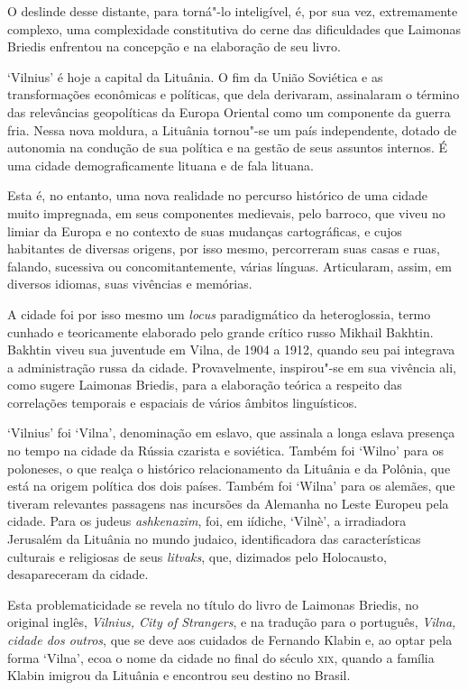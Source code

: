 O deslinde desse distante, para torná"-lo inteligível, é, por sua vez,
extremamente complexo, uma complexidade constitutiva do cerne das
dificuldades que Laimonas Briedis enfrentou na concepção e na elaboração
de seu livro.

`Vilnius' é hoje a capital da Lituânia. O fim da União Soviética e as
transformações econômicas e políticas, que dela derivaram, assinalaram o
término das relevâncias geopolíticas da Europa Oriental como um
componente da guerra fria. Nessa nova moldura, a Lituânia tornou"-se um
país independente, dotado de autonomia na condução de sua política e na
gestão de seus assuntos internos. É uma cidade demograficamente lituana
e de fala lituana.

Esta é, no entanto, uma nova realidade no percurso histórico de uma
cidade muito impregnada, em seus componentes medievais, pelo barroco,
que viveu no limiar da Europa e no contexto de suas mudanças
cartográficas, e cujos habitantes de diversas origens, por isso mesmo,
percorreram suas casas e ruas, falando, sucessiva ou concomitantemente,
várias línguas. Articularam, assim, em diversos idiomas, suas vivências
e memórias.

A cidade foi por isso mesmo um \textit{locus} paradigmático da
heteroglossia, termo cunhado e teoricamente elaborado pelo grande
crítico russo Mikhail Bakhtin. Bakhtin viveu sua juventude em Vilna, de
1904 a 1912, quando seu pai integrava a administração russa da cidade.
Provavelmente, inspirou"-se em sua vivência ali, como sugere Laimonas
Briedis, para a elaboração teórica a respeito das correlações temporais
e espaciais de vários âmbitos linguísticos.

`Vilnius' foi `Vilna', denominação em eslavo, que assinala a longa
eslava presença no tempo na cidade da Rússia czarista e soviética.
Também foi `Wilno' para os poloneses, o que realça o histórico
relacionamento da Lituânia e da Polônia, que está na origem política dos
dois países. Também foi `Wilna' para os alemães, que tiveram relevantes
passagens nas incursões da Alemanha no Leste Europeu pela cidade. Para
os judeus \textit{ashkenazim}, foi, em iídiche, `Vilnè', a irradiadora
Jerusalém da Lituânia no mundo judaico, identificadora das
características culturais e religiosas de seus \textit{litvaks}, que,
dizimados pelo Holocausto, desapareceram da cidade.

Esta problematicidade se revela no título do livro de Laimonas Briedis,
no original inglês, \textit{Vilnius, City of Strangers}, e na tradução
para o português, \textit{Vilna, cidade dos outros}, que se deve aos
cuidados de Fernando Klabin e, ao optar pela forma `Vilna', ecoa o nome
da cidade no final do século \textsc{xix}, quando a família Klabin imigrou da
Lituânia e encontrou seu destino no Brasil.

